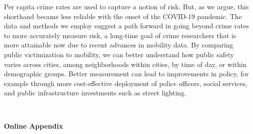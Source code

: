 \documentclass[12pt]{article}
\begin{document}

Per capita crime rates are used to capture a notion of risk. But, as we argue, this shorthand became less reliable with the onset of the COVID-19 pandemic. The data and methods we employ suggest a path forward in going beyond crime rates to more accurately measure risk, a long-time goal of crime researchers that is more attainable now due to recent advances in mobility data. By comparing public victimization to mobility, we can better understand how public safety varies across cities, among neighborhoods within cities, by time of day, or within demographic groups. Better measurement can lead to improvements in policy, for example through more cost-effective deployment of police officers, social services, and public infrastructure investments such as street lighting.


\newpage
\singlespacing





\newpage 
\clearpage 



\newpage 
\clearpage
\vspace*{90mm} \\
\begin{center}
\Huge{\textbf{Online Appendix}}
\end{center}

\newpage

%

\appendix 
\end{document}
